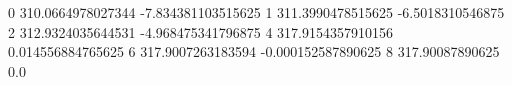 0 310.0664978027344 -7.834381103515625
1 311.3990478515625 -6.5018310546875
2 312.9324035644531 -4.968475341796875
4 317.9154357910156 0.014556884765625
6 317.9007263183594 -0.000152587890625
8 317.90087890625 0.0
